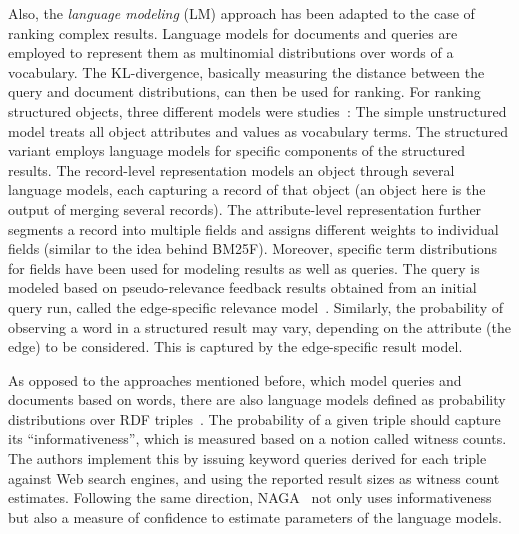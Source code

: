 Also, the \emph{language modeling} (LM) approach has been adapted to the case of ranking complex results. Language models for documents and queries are employed to represent them as multinomial distributions over words of a vocabulary. The KL-divergence, basically measuring the distance between the query and document distributions, can then be used for ranking. For ranking structured objects, three different models were studies~\cite{DBLP:conf/www/NieMSWM07}: The simple unstructured model treats all object attributes and values as vocabulary terms. The structured variant employs language models for specific components of the structured results. The record-level representation models an object through several language models, each capturing a record of that object (an object here is the output of merging several records). The attribute-level representation further segments a record into multiple fields and assigns different weights to individual fields (similar to the idea behind BM25F). 
Moreover, specific term distributions for fields have been used for modeling results as well as queries. The query is modeled based on pseudo-relevance feedback results obtained from an initial query run, called the edge-specific relevance model~\cite{DBLP:conf/cikm/BicerTN11}. Similarly, the probability of observing a word in a structured result may vary, depending on the attribute (the edge) to be considered. This is captured by the edge-specific result model. 
%

As opposed to the approaches mentioned before, which model queries and documents based on words, there are also language models defined as probability distributions over RDF triples~\cite{DBLP:journals/debu/ElbassuoniRSW10}. The probability of a given triple should capture its ``informativeness'', which is measured based on a notion called witness counts. The authors implement this by issuing keyword queries derived for each triple against Web search engines, and using the reported result sizes as witness count estimates. Following the same direction, NAGA~\cite{DBLP:conf/icde/KasneciSIRW08} not only uses informativeness but also a measure of confidence to estimate parameters of the language models. 

